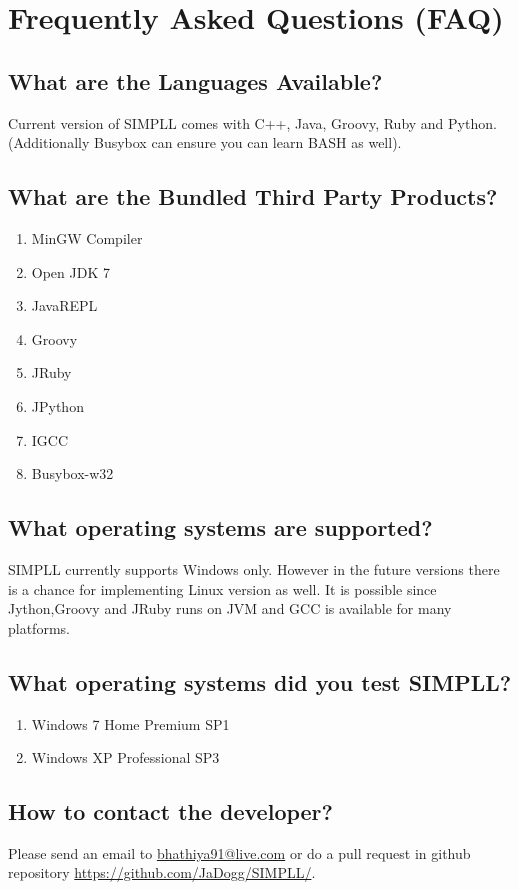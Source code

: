 \documentclass[a4paper]{article}
\begin{document}
\section{Frequently Asked Questions (FAQ)}


\subsection{What are the Languages Available?}

Current version of SIMPLL comes with C++, Java, Groovy, Ruby and Python.  (Additionally Busybox can ensure you can learn BASH as well).


\subsection{What are the Bundled Third Party Products?}

\begin{enumerate}
\item MinGW Compiler
\item Open JDK 7
\item JavaREPL
\item Groovy
\item JRuby
\item JPython
\item IGCC
\item Busybox-w32 
\end{enumerate}


\subsection{What operating systems are supported?}
SIMPLL currently supports Windows only. However in the future versions there is a chance for implementing Linux version as well. It is possible since Jython,Groovy and JRuby runs on JVM and GCC is available for many platforms.

\subsection{What operating systems did you test SIMPLL?} 

\begin{enumerate}
\item Windows 7 Home Premium SP1 
\item Windows XP Professional SP3
\end{enumerate}

\subsection{How to contact the developer?}
Please send an email to \href{mailto:bhathiya91@live.com}{bhathiya91@live.com} or do a pull request in github repository \url{https://github.com/JaDogg/SIMPLL/}.
\end{document}
